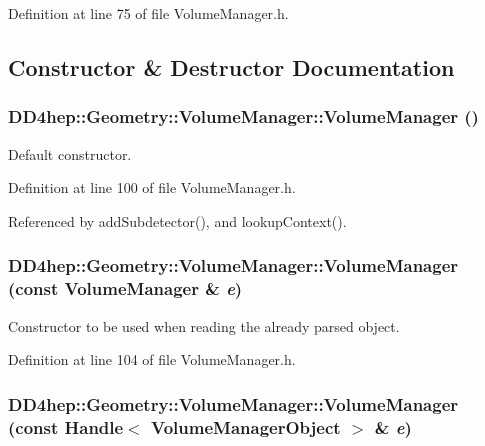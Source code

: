 Definition at line 75 of file VolumeManager.h.

\subsection{Constructor \& Destructor Documentation}
\hypertarget{class_d_d4hep_1_1_geometry_1_1_volume_manager_a5dc0919df1764151f01b9c026f957a5b}{
\subsubsection[{VolumeManager}]{\setlength{\rightskip}{0pt plus 5cm}DD4hep::Geometry::VolumeManager::VolumeManager ()}}
\label{class_d_d4hep_1_1_geometry_1_1_volume_manager_a5dc0919df1764151f01b9c026f957a5b}


Default constructor. 

Definition at line 100 of file VolumeManager.h.

Referenced by addSubdetector(), and lookupContext().\hypertarget{class_d_d4hep_1_1_geometry_1_1_volume_manager_aea6772fb6a92c17765eb90c3362f59b6}{
\subsubsection[{VolumeManager}]{\setlength{\rightskip}{0pt plus 5cm}DD4hep::Geometry::VolumeManager::VolumeManager (const {\bf VolumeManager} \& {\em e})}}
\label{class_d_d4hep_1_1_geometry_1_1_volume_manager_aea6772fb6a92c17765eb90c3362f59b6}


Constructor to be used when reading the already parsed object. 

Definition at line 104 of file VolumeManager.h.\hypertarget{class_d_d4hep_1_1_geometry_1_1_volume_manager_abb2a930f5dbb6da83d03a6b17f81d3ee}{
\subsubsection[{VolumeManager}]{\setlength{\rightskip}{0pt plus 5cm}DD4hep::Geometry::VolumeManager::VolumeManager (const {\bf Handle}$<$ {\bf VolumeManagerObject} $>$ \& {\em e})}}
\label{class_d_d4hep_1_1_geometry_1_1_volume_manager_abb2a930f5dbb6da83d03a6b17f81d3ee}


